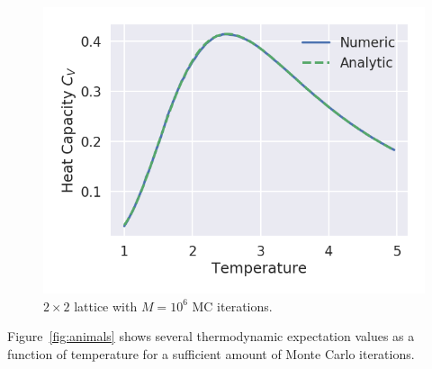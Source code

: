 \documentclass[aps,reprint]{revtex4-1}
\begin{document}
\begin{figure}
  \centering
  \includegraphics[width=\columnwidth]{figures/L2Ne6.png}
  \caption{$2 \times 2$ lattice with $M = 10^6$ MC iterations.}
  \label{fig:L2Ne6}
\end{figure}
Figure~\ref{fig:animals} shows several thermodynamic expectation values
as a function of temperature for a sufficient amount of Monte Carlo iterations.
\end{document}

